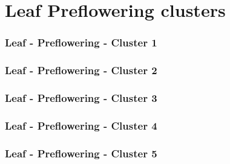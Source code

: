 \section{Leaf Preflowering clusters}

\subsubsection{Leaf - Preflowering - Cluster 1}

\vspace{1em}



\clearpage

\subsubsection{Leaf - Preflowering - Cluster 2}

\vspace{1em}



\clearpage

\subsubsection{Leaf - Preflowering - Cluster 3}

\vspace{1em}



\clearpage

\subsubsection{Leaf - Preflowering - Cluster 4}

\vspace{1em}



\clearpage

\subsubsection{Leaf - Preflowering - Cluster 5}

\vspace{1em}

